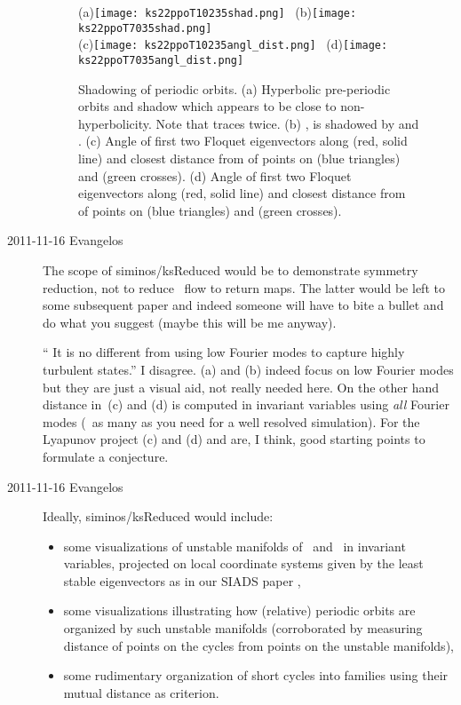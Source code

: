 \begin{description}
\begin{figure}[ht]
  \begin{center}
    (a)\texttt{[image: ks22ppoT10235shad.png]}~
    (b)\texttt{[image: ks22ppoT7035shad.png]}\\
    (c)\texttt{[image: ks22ppoT10235angl\_dist.png]}~
    (d)\texttt{[image: ks22ppoT7035angl\_dist.png]}
  \end{center}
  \caption{Shadowing of periodic orbits. (a) Hyperbolic pre-periodic orbits
     and  shadow  which appears to be close
    to non-hyperbolicity. Note that  traces  twice.
    (b) , is shadowed by  and .
    (c) Angle of first two Floquet eigenvectors along  (red, solid line) and
    closest distance from  of points on  (blue triangles) and 
    (green crosses). (d) Angle of first two Floquet eigenvectors along  (red, solid line) and
    closest distance from  of points on  (blue triangles) and 
    (green crosses).
    }
  \label{fig:ks22shad}
\end{figure}


\item[2011-11-16 Evangelos] The scope of siminos/ksReduced would be to
demonstrate symmetry reduction, not to reduce \KS\ flow to return maps.
The latter would be left to some subsequent paper and indeed someone will have
to bite a bullet and do what you suggest (maybe this will be me anyway).

`` It is no different from using low Fourier modes to capture
highly turbulent states.'' I disagree. (a)
and (b) indeed focus on low Fourier modes but they are just a visual aid,
not really needed here. On the other hand distance in
\,(c) and (d) is computed in invariant variables using
\emph{all} Fourier modes (\ie\ as many as you need for a well resolved
simulation). For the Lyapunov project (c) and (d)
and  are, I think, good starting points to formulate
a conjecture.

\item[2011-11-16 Evangelos]
Ideally, siminos/ksReduced would include:
\begin{itemize}
 \item some visualizations of unstable manifolds of \eqva\ and \reqva\
	in invariant variables, projected on local coordinate systems
	given by the least stable eigenvectors as in our
	SIADS paper ,
 \item some visualizations illustrating how (relative) periodic orbits are
	organized by such unstable manifolds (corroborated by measuring distance
	of points on the cycles from points on the unstable manifolds),
 \item some rudimentary organization of short cycles into families using
	their mutual distance as criterion.
\end{itemize}


\end{description}
